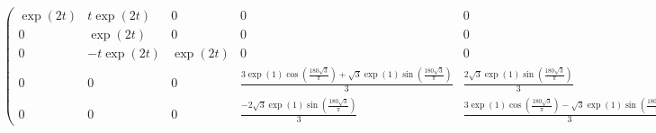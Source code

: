 \begin{solution}
\begin{align*}
\begin{pmatrix}
    \exp(2t) & t\exp(2t) & 0 & 0 & 0 \\
    0 & \exp(2t) & 0 & 0 & 0 \\
    0 & -t\exp(2t) & \exp(2t) & 0 & 0 \\
    0 & 0 & 0 &
    \frac{3\exp(1)\cos(\frac{180\sqrt{3}}{\pi})+\sqrt{3}\exp(1)\sin(\frac{180\sqrt
    {3}}{\pi})}{3} & \frac{2\sqrt{3}\exp(1)\sin(\frac{180\sqrt{3}}{\pi})}{3}
    \\
    0 & 0 & 0 & \frac{-2\sqrt{3}\exp(1)\sin(\frac{180\sqrt{3}}{\pi})}{3} &
    \frac{3\exp(1)\cos(\frac{180\sqrt{3}}{\pi})-
    \sqrt{3}\exp(1)\sin(\frac{180\sqrt{3}}{\pi})}{3}
  \end{pmatrix}
\end{align*}
\end{solution}
